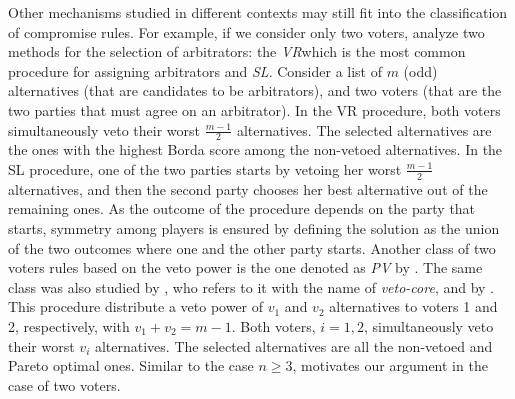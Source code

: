 Other mechanisms studied in different contexts may still fit into the classification of compromise rules. For example, if we consider only two voters, \citet{Clippel2014} analyze two methods for the selection of arbitrators: the \emph{\ac{VR}}\textemdash which is the most common procedure for assigning arbitrators \citep[Online Appendix]{Clippel2014}\textemdash and \emph{\ac{SL}}.
Consider a list of $m$ (odd) alternatives (that are candidates to be arbitrators), and two voters (that are the two parties that must agree on an arbitrator). In the \acs{VR} procedure, both voters simultaneously veto their worst $\frac{m-1}{2}$ alternatives. The selected alternatives are the ones with the highest Borda score among the non-vetoed alternatives. 
In the \acs{SL} procedure, one of the two parties starts by vetoing her worst $\frac{m-1}{2}$ alternatives, and then the second party chooses her best alternative out of the remaining ones. As the outcome of the procedure depends on the party that starts, symmetry among players is ensured by defining the solution as the union of the two outcomes where one and the other party starts.
Another class of two voters rules based on the veto power is the one denoted as \emph{\ac{PV}} by \citet{Laslier2020}. The same class was also studied by \citet{Moulin1983}, who refers to it with the name of \textit{veto-core}, and by \citet{Abreu1991}. This procedure distribute a veto power of $v_1$ and $v_2$ alternatives to voters 1 and 2, respectively, with $v_1+v_2=m-1$. Both voters, $i=1,2$, simultaneously veto their worst $v_i$ alternatives. The selected alternatives are all the non-vetoed and Pareto optimal ones.
Similar to the case $n\geq3$,  motivates our argument in the case of two voters.

